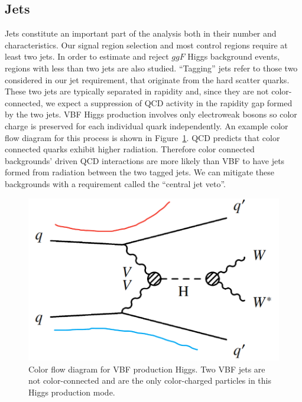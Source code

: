 \begin{table}[h]
  \centering
  \caption{Muon selections}
  \label{tab:MuonSelection}
\end{table}


\subsection{Jets}

Jets constitute an important part of the analysis both in their number and characteristics. Our signal region selection and most control regions require at least two jets. In order to estimate and reject $ggF$ Higgs background events, regions with less than two jets are also studied. ``Tagging'' jets refer to those two considered in our jet requirement, that originate from the hard scatter quarks. These two jets are typically separated in rapidity and, since they are not color-connected, we expect a suppression of QCD activity in the rapidity gap formed by the two jets. VBF Higgs production involves only electroweak bosons so color charge is preserved for each individual quark independently. An example color flow diagram for this process is shown in Figure~\ref{fig:colorflow}. QCD predicts that color connected quarks exhibit higher radiation. Therefore color connected backgrounds' driven QCD interactions are more likely than VBF to have jets formed from radiation between the two tagged jets. We can mitigate these backgrounds with a requirement called the ``central jet veto''.  

\begin{figure}[!htbp]
    \centering
    \includegraphics[width=0.5\linewidth]{Pictures/fig_01b_2-edited.pdf}
    \caption{Color flow diagram for VBF production Higgs. Two VBF jets are not color-connected and are the only color-charged particles in this Higgs production mode.}
    \label{fig:colorflow}
\end{figure}

